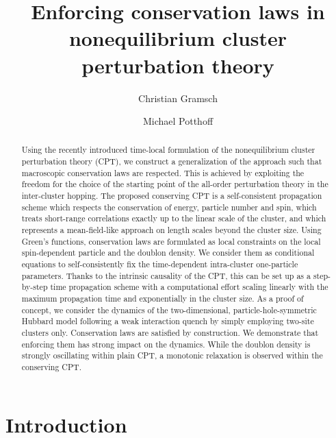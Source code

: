 \documentclass[twocolumn,prb,showpacs,aps,superscriptaddress]{revtex4}
\begin{document}
\title{Enforcing conservation laws in nonequilibrium cluster perturbation
theory}

\author{Christian Gramsch} 
\author{Michael Potthoff} 


\begin{abstract} 
Using the recently introduced time-local formulation of the nonequilibrium
cluster perturbation theory (CPT), we construct a generalization of the
approach such that macroscopic conservation laws are respected.  This is
achieved by exploiting the freedom for the choice of the starting point of the
all-order perturbation theory in the inter-cluster hopping.  The proposed
conserving CPT is a self-consistent propagation scheme which respects the
conservation of energy, particle number and spin, which treats short-range
correlations exactly up to the linear scale of the cluster, and which
represents a mean-field-like approach on length scales beyond the cluster size.
Using Green's functions, conservation laws are formulated as local constraints
on the local spin-dependent particle and the doublon density.  We
consider them as conditional equations to self-consistently fix the
time-dependent intra-cluster one-particle parameters.  Thanks to the intrinsic
causality of the CPT, this can be set up as a step-by-step time propagation
scheme with a computational effort scaling linearly with the maximum
propagation time and exponentially in the cluster size.  As a proof of concept,
we consider the dynamics of the two-dimensional, particle-hole-symmetric
Hubbard model following a weak interaction quench by simply employing two-site
clusters only.  Conservation laws are satisfied by construction.  We
demonstrate that enforcing them has strong impact on the dynamics.  While the
doublon density is strongly oscillating within plain CPT, a monotonic
relaxation is observed within the conserving CPT.
\end{abstract}

\maketitle

\section{Introduction}
\label{sec:intro}
\end{document}
